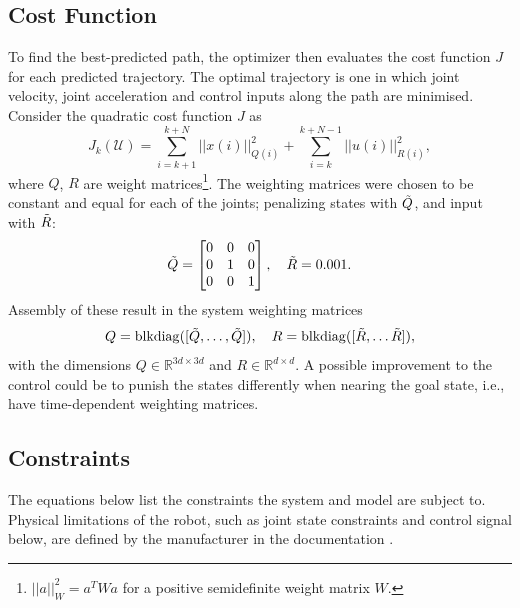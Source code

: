 \documentclass[final]{LTHtwocol} %
\begin{document}
\subsection{Cost Function}
To find the best-predicted path, the optimizer then evaluates the cost function $J$ for each predicted trajectory. The optimal trajectory is one in which joint velocity, joint acceleration and control inputs along the path are minimised. Consider the quadratic cost function $J$ as
\begin{equation}
    \label{eq:costFunc}
    J_k(\mathcal{U}) = \sum_{i=k+1}^{k+N}||x(i)||^2_{Q(i)}
    + \sum_{i=k}^{k+N-1}||u(i)||^2_{R(i)},
\end{equation}
where $Q$, $R$ are weight matrices\footnote{$||a||^2_W = a^TWa$ for a positive semidefinite weight matrix $W$.}. The weighting matrices were chosen to be constant and equal for each of the joints; penalizing states with $\Tilde{Q}$, and input with $\Tilde{R}$:
\begin{equation}
    \Tilde{Q} = \begin{bmatrix}0 & 0 & 0 \\ 0 & 1 & 0 \\ 0 & 0 & 1\end{bmatrix}, \quad \Tilde{R} = 0.001.
\end{equation}
Assembly of these result in the system weighting matrices
\begin{equation}
    Q = \mathrm{blkdiag}([\Tilde{Q},\dots, \Tilde{Q}]), \quad 
    R = \mathrm{blkdiag}([\Tilde{R}, \dots \Tilde{R}]),
\end{equation}
with the dimensions $Q\in \mathbb{R}^{3d\times 3d}$ and $R\in \mathbb{R}^{d\times d}$.
A possible improvement to the control could be to punish the states differently when nearing the goal state, i.e., have time-dependent weighting matrices. 


\subsection{Constraints}
The equations below list the constraints the system and model are subject to. Physical limitations of the robot, such as joint state constraints and control signal below, are defined by the manufacturer in the documentation \cite{frankadocs}.
\end{document}
